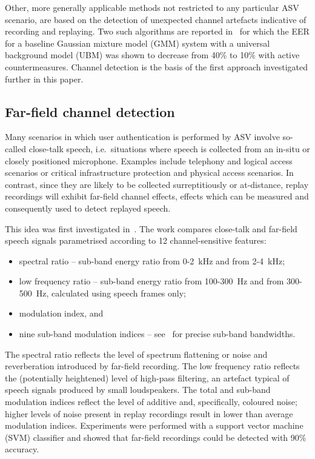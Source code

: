 Other, more generally applicable methods not restricted to any particular ASV scenario, are based on the detection of unexpected channel artefacts indicative of recording and replaying.
Two such algorithms are reported in~\cite{Wang2011} for which the EER for a baseline Gaussian mixture model (GMM) system with a universal background model (UBM) was shown to decrease from 40\% to 10\% with active countermeasures.  Channel detection is the basis of the first approach investigated further in this paper.



\subsection{Far-field channel detection}
\label{subsec:ffd}

Many scenarios in which user authentication is performed by ASV involve so-called close-talk speech, i.e.\ situations where speech is collected from an in-situ or closely positioned microphone.  Examples include telephony and logical access scenarios or critical infrastructure protection and physical access scenarios.  In contrast, since they are likely to be collected surreptitiously or at-distance, replay recordings will exhibit far-field channel effects, effects which can be measured and consequently used to detect replayed speech.  

This idea was first investigated in~\cite{Villalba2011}.  The work compares close-talk and far-field speech signals parametrised according to 12 channel-sensitive features:


\begin{itemize}
\item spectral ratio -- sub-band energy ratio from 0-2~kHz and from 2-4~kHz; 
\item low frequency ratio -- sub-band energy ratio from 100-300~Hz and from 300-500~Hz, calculated using speech frames only;
\item modulation index, and
\item nine sub-band modulation indices -- see~\cite{Villalba2011} for precise sub-band bandwidths.
\end{itemize}


The spectral ratio reflects the level of spectrum flattening or noise and reverberation introduced by far-field recording.  The low frequency ratio reflects the (potentially heightened) level of high-pass filtering, an artefact typical of speech signals produced by small loudspeakers.  The total and sub-band modulation indices reflect the level of additive and, specifically, coloured noise; higher levels of noise present in replay recordings result in lower than average modulation indices.  Experiments were performed with a support vector machine (SVM) classifier and showed that far-field recordings could be detected with 90\% accuracy.  %



